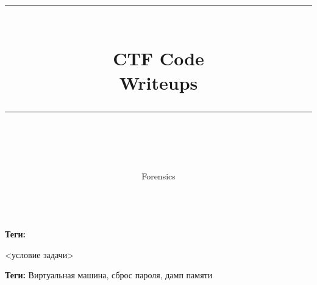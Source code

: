 \documentclass[idxtotoc,hyperref,openany,oneside]{files/forensics} %
\newcommand{\HRule}{\rule{\linewidth}{0.5mm}} %
\begin{document}

\frontmatter %
\title{
\begin{center}
\HRule \\[0.4cm]
{\Huge \bfseries CTF Code \\[0.5cm] \Large Writeups}\\[0.4cm] %
\HRule \\[1.5cm]
\end{center}
}
\author{\Huge Forensics \\ \\[2cm]} %
\maketitle

\tableofcontents

\mainmatter %












\textbf{Теги:} \vspace{\baselineskip}

\begin{tcolorbox}
<условие задачи>
\end{tcolorbox}



\textbf{Теги:} Виртуальная машина, сброс пароля, дамп памяти\vspace{\baselineskip}
\end{document}

